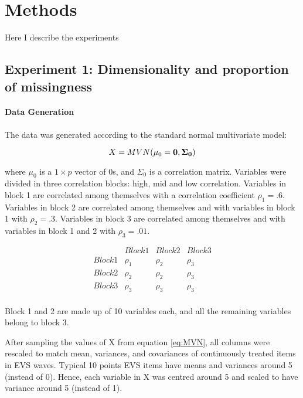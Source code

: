\maketitle
\section{Methods}

Here I describe the experiments

\subsection{Experiment 1: Dimensionality and proportion of missingness}

\paragraph{Data Generation}

The data was generated according to the standard normal multivariate model:

\begin{equation}
	X = MVN(\mu_0 = \bf{0}, \Sigma_0) \label{eq:MVN}
\end{equation}

where $\mu_0$ is a $1 \times p$ vector of 0s, and $\Sigma_0$ is a correlation matrix. Variables were divided in 
three correlation blocks: high, mid and low correlation. Variables in block 1 are correlated among themselves with 
a correlation coefficient $\rho_1 = .6$. Variables in block 2 are correlated among themselves and with variables in 
block 1 with $\rho_2 = .3$. Variables in block 3 are correlated among themselves and with variables in block 1 and 2 
with $\rho_3 = .01$.

$$
\begin{matrix}
		& Block 1 	& Block 2	& Block 3	\\
	Block 1	& \rho_1	& \rho_2 	& \rho_3 	\\
	Block 2 & \rho_2	& \rho_2	& \rho_3 	\\
	Block 3	& \rho_3 	& \rho_3	& \rho_3 	\\
\end{matrix}
$$

Block 1 and 2 are made up of 10 variables each, and all the remaining variables belong to block 3.

After sampling the values of X from equation \ref{eq:MVN}, all columns were rescaled to match mean, variances, and covariances 
of continuously treated items in EVS waves. Typical 10 points EVS items have means and variances around 5 (instead 
of 0). Hence, each variable in X was centred around 5 and scaled to have variance around 5 (instead of 1).

